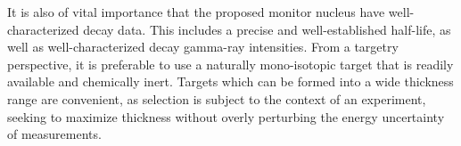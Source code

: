 \documentclass[3p]{elsarticle}
\newcommand{\comment}[1]{\todo[color=blue!20!white,inline]{ASV: #1}}
\begin{document}
It is also of vital importance that the proposed monitor nucleus have well-characterized decay data.
This includes a precise and well-established half-life,  
as well as well-characterized decay gamma-ray intensities.
From a targetry  perspective, it is preferable to use a naturally mono-isotopic target that is readily available
and  chemically inert.
Targets which can be formed into a wide thickness range are convenient, as selection is subject to the context of an experiment, seeking to maximize thickness without overly perturbing the energy uncertainty of  measurements.
\end{document}
